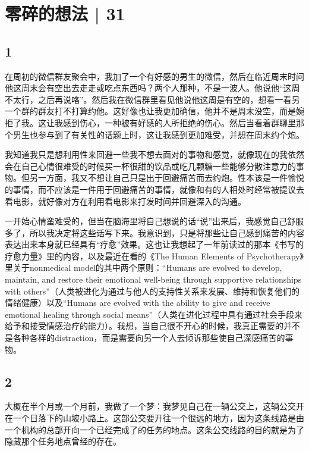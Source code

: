 \chapter{零碎的想法 | 31}



\section*{1}

在周初的微信群友聚会中，我加了一个有好感的男生的微信，然后在临近周末时问他这周末会有空出去走走或吃点东西吗？两个人那种，不是一波人。他说他“这周不太行，之后再说咯”。然后我在微信群里看见他说他这周是有空的，想看一看另一个群的群友打不打算约他。这好像也让我更加确信，他并不是周末没空，而是婉拒了我。这让我感到伤心，一种被有好感的人所拒绝的伤心。然后当看着群聊里那个男生也参与到了有关性的话题上时，这让我感到更加难受，并想在周末约个炮。

我知道我只是想利用性来回避一些我不想去面对的事物和感觉，就像现在的我依然会在自己心情很难受的时候买一杯很甜的饮品或吃几颗糖\pozhehao{}一些能够分散注意力的事物。但另一方面，我又不想让自己只是出于回避痛苦而去约炮。性本该是一件愉悦的事情，而不应该是一件用于回避痛苦的事情，就像和有的人相处时经常被提议去看电影，就好像对方在利用看电影来打发时间并回避深入的沟通。

\tristarsepline

一开始心情蛮难受的，但当在脑海里将自己想说的话“说”出来后，我感觉自己舒服多了，所以我决定将这些话写下来。我意识到，只是将那些让自己感到痛苦的内容表达出来本身就已经具有“疗愈”效果。这也让我想起了一年前读过的那本《书写的疗愈力量》里的内容，以及最近在看的《The Human Elements of Psychotherapy》里关于nonmedical model的其中两个原则：“Humans are evolved to develop, maintain, and restore their emotional well-being through supportive relationships with others”（人类被进化为通过与他人的支持性关系来发展、维持和恢复他们的情绪健康）以及“Humans are evolved with the ability to give and receive emotional healing through social means”（人类在进化过程中具有通过社会手段来给予和接受情感治疗的能力）。我想，当自己很不开心的时候，我真正需要的并不是各种各样的distraction，而是需要向另一个人去倾诉那些使自己深感痛苦的事物。



\section*{2}

大概在半个月或一个月前，我做了一个梦：我梦见自己在一辆公交上，这辆公交开在一个日落下的山坡小路上。这部公交要开往一个很远的地方，因为这条线路是由一个机构的总部开向一个已经完成了的任务的地点。这条公交线路的目的就是为了隐藏那个任务地点曾经的存在。

